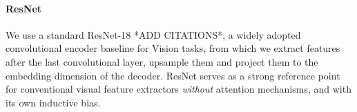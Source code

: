 
\paragraph{ResNet}
We use a standard ResNet-18 *ADD CITATIONS*, a widely adopted convolutional encoder baseline for Vision tasks, from which we extract features after the last convolutional layer, upsample them and project them to the embedding dimension of the decoder. ResNet serves as a strong reference point for conventional visual feature extractors \textit{without} attention mechanisms, and with its own inductive bias.

